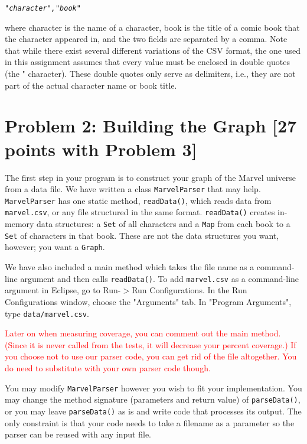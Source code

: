 \documentclass[11pt]{article}
\begin{document}
\noindent \texttt{\textit{"character","book"}}

\noindent where character is the name of a character, book is the title of a comic book that the character appeared in, and the two fields are separated by a comma. Note that while there exist several different variations of the CSV format, the one used in this assignment assumes that every value must be enclosed in double quotes (the " character). These double quotes only serve as delimiters, i.e., they are not part of the actual character name or book title.

\section*{Problem 2: Building the Graph [27 points with Problem 3]}
\label{sec:Problem 2}

\noindent The first step in your program is to construct your graph of the Marvel universe from a data file. We have written a class \texttt{MarvelParser} that may help. \texttt{MarvelParser} has one static method, \texttt{readData()}, which reads data from \texttt{marvel.csv}, or any file structured in the same format. \texttt{readData()} creates in-memory data structures: a \texttt{Set} of all characters and a \texttt{Map} from each book to a \texttt{Set} of characters in that book. These are not the data structures you want, however; you want a \texttt{Graph}.

\noindent We have also included a main method which takes the file name as a command-line argument and then calls \texttt{readData()}. To add \texttt{marvel.csv} as a command-line argument in Eclipse, go to Run-$>$Run Configurations. In the Run Configurations window, choose the "Arguments" tab. In "Program Arguments", type \texttt{data/marvel.csv}.

\noindent \textcolor{red}{Later on when measuring coverage, you can comment out the main method. (Since it is never called from the tests, it will decrease your percent coverage.) If you choose not to use our parser code, you can get rid of the file altogether. You do need to substitute with your own parser code though.}

\noindent You may modify \texttt{MarvelParser} however you wish to fit your implementation. You may change the method signature (parameters and return value) of \texttt{parseData()}, or you may leave \texttt{parseData()} as is and write code that processes its output. The only constraint is that your code needs to take a filename as a parameter so the parser can be reused with any input file.
\newline
\end{document}
